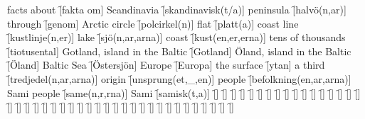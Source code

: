 \begin{questions}
    \begin{multicols}{2}
        \raggedcolumns
        \question facts about \f[fakta om]
        \question Scandinavia \f[skandinavisk(t/a)]
        \question peninsula \f[halvö(n,ar)]
        \question through \f[genom]
        \question Arctic circle \f[polcirkel(n)]
        \question flat \f[platt(a)]
        \question coast line \f[kustlinje(n,er)]
        \question lake \f[sjö(n,ar,arna)]
        \question coast \f[kust(en,er,erna)]
        \question tens of thousands \f[tiotusental]
        \question Gotland, island in the Baltic \f[Gotland]
        \question Öland, island in the Baltic \f[Öland]
        \question Baltic Sea \f[Östersjön]
        \question Europe \f[Europa]
        \question the surface \f[ytan]
        \question a third \f[tredjedel(n,ar,arna)]
        \question origin \f[unsprung(et,\_,en)]
        \question people \f[befolkning(en,ar,arna)]
        \question Sami people \f[same(n,r,rna)]
        \question Sami \f[samisk(t,a)]
        \question  \f[]
        \question  \f[]
        \question  \f[]
        \question  \f[]
        \question  \f[]
        \question  \f[]
        \question  \f[]
        \question  \f[]
        \question  \f[]
        \question  \f[]
        \question  \f[]
        \question  \f[]
        \question  \f[]
        \question  \f[]
        \question  \f[]
        \question  \f[]
        \question  \f[]
        \question  \f[]
        \question  \f[]
        \question  \f[]
        \question  \f[]
        \question  \f[]
        \question  \f[]
        \question  \f[]
        \question  \f[]
        \question  \f[]
        \question  \f[]
        \question  \f[]
        \question  \f[]
        \question  \f[]
        \question  \f[]
        \question  \f[]
        \question  \f[]
        \question  \f[]
        \question  \f[]
        \question  \f[]
        \question  \f[]
        \question  \f[]
        \question  \f[]
        \question  \f[]
        \question  \f[]
        \question  \f[]
        \question  \f[]
    \end{multicols}
\end{questions}
